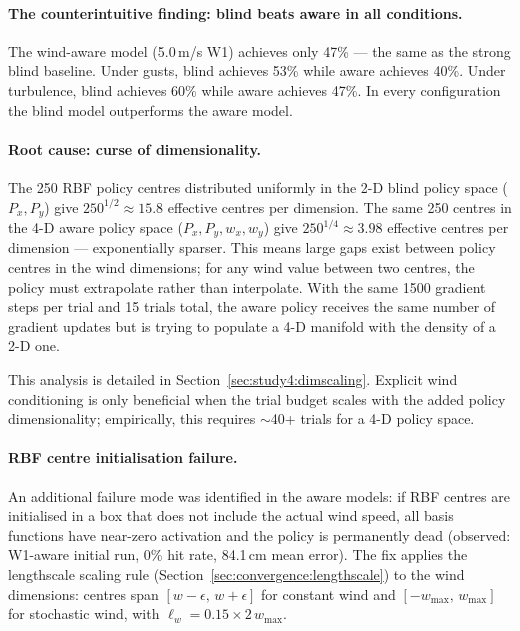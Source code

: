\paragraph{The counterintuitive finding: blind beats aware in all conditions.}
The wind-aware model (5.0\,m/s W1) achieves only 47\% --- the same as the strong blind
baseline.
Under gusts, blind achieves 53\% while aware achieves 40\%.
Under turbulence, blind achieves 60\% while aware achieves 47\%.
In every configuration the blind model outperforms the aware model.

\paragraph{Root cause: curse of dimensionality.}
The 250 RBF policy centres distributed uniformly in the 2-D blind policy space
($P_x, P_y$) give $250^{1/2} \approx 15.8$ effective centres per dimension.
The same 250 centres in the 4-D aware policy space ($P_x, P_y, w_x, w_y$) give
$250^{1/4} \approx 3.98$ effective centres per dimension — exponentially sparser.
This means large gaps exist between policy centres in the wind dimensions; for any
wind value between two centres, the policy must extrapolate rather than interpolate.
With the same 1500 gradient steps per trial and 15 trials total, the aware policy
receives the same number of gradient updates but is trying to populate a 4-D manifold
with the density of a 2-D one.

This analysis is detailed in Section~\ref{sec:study4:dimscaling}.
Explicit wind conditioning is only beneficial when the trial budget scales with the
added policy dimensionality; empirically, this requires $\sim$40+ trials for a
4-D policy space.

\paragraph{RBF centre initialisation failure.}
An additional failure mode was identified in the aware models: if RBF centres are
initialised in a box that does not include the actual wind speed, all basis functions
have near-zero activation and the policy is permanently dead (observed: W1-aware
initial run, 0\% hit rate, 84.1\,cm mean error).
The fix applies the lengthscale scaling rule (Section~\ref{sec:convergence:lengthscale})
to the wind dimensions: centres span $[w - \epsilon,\, w + \epsilon]$ for constant wind
and $[-w_{\max},\, w_{\max}]$ for stochastic wind, with $\ell_w = 0.15 \times
2\,w_{\max}$.

